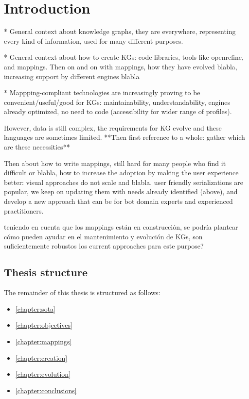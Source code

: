 \chapter{Introduction}
\label{chapter:intro}


* General context about knowledge graphs, they are everywhere, representing every kind of information, used for many different purposes. 

* General context about how to create KGs: code libraries, tools like openrefine, and mappings. Then on and on with mappings, how they have evolved blabla, increasing support by different engines blabla

* Mappping-compliant technologies are increasingly proving to be convenient/useful/good for KGs: maintainability, understandability, engines already optimized, no need to code (accessibility for wider range of profiles). 

However, data is still complex, the requirements for KG evolve and these languages are sometimes limited. **Then first reference to a whole: gather which are these necessities**

Then about how to write mappings, still hard for many people who find it difficult or blabla, how to increase the adoption by making the user experience better: visual approaches do not scale and blabla. user friendly serializations are popular, we keep on updating them with needs already identified (above), and develop a new approach that can be for bot domain experts and experienced practitioners.

 teniendo en cuenta que los mappings están en construcción, se podría plantear cómo pueden ayudar en el mantenimiento y evolución de KGs, son suficientemente robustos los current approaches para este purpose?

\section{Thesis structure}

The remainder of this thesis is structured as follows:

\begin{itemize}
    \item \cref{chapter:sota}
    \item \cref{chapter:objectives}
    \item \cref{chapter:mappings}
    \item \cref{chapter:creation}
    \item \cref{chapter:evolution}
    \item \cref{chapter:conclusions}
\end{itemize}


